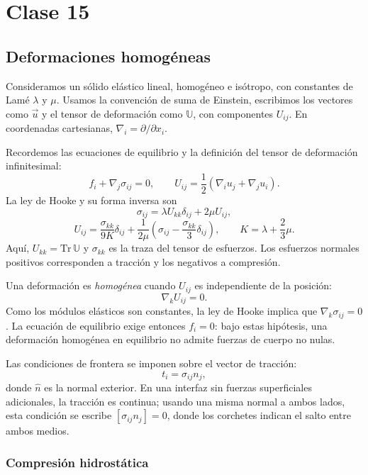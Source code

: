 \chapter{Clase 15}

\section{Deformaciones homogéneas}

Consideramos un sólido elástico lineal, homogéneo e isótropo, con constantes de Lamé $\lambda$ y $\mu$. Usamos la convención de suma de Einstein, escribimos los vectores como $\vec u$ y el tensor de deformación como $\mathbb U$, con componentes $U_{ij}$. En coordenadas cartesianas, $\nabla_i=\partial/\partial x_i$.

Recordemos las ecuaciones de equilibrio y la definición del tensor de deformación infinitesimal:
\[
f_i+\nabla_j\sigma_{ij}=0,
\qquad
U_{ij}=\frac{1}{2}(\nabla_i u_j+\nabla_j u_i).
\]
La ley de Hooke y su forma inversa son
\[
\sigma_{ij}=\lambda U_{kk}\delta_{ij}+2\mu U_{ij},
\]
\[
U_{ij}=\frac{\sigma_{kk}}{9K}\delta_{ij}
+\frac{1}{2\mu}\left(\sigma_{ij}-\frac{\sigma_{kk}}{3}\delta_{ij}\right),
\qquad K=\lambda+\frac{2}{3}\mu.
\]
Aquí, $U_{kk}=\mathrm{Tr}\,\mathbb U$ y $\sigma_{kk}$ es la traza del tensor de esfuerzos. Los esfuerzos normales positivos corresponden a tracción y los negativos a compresión.

Una deformación es \emph{homogénea} cuando $U_{ij}$ es independiente de la posición:
\[
\nabla_k U_{ij}=0.
\]
Como los módulos elásticos son constantes, la ley de Hooke implica que $\nabla_k\sigma_{ij}=0$. La ecuación de equilibrio exige entonces $f_i=0$: bajo estas hipótesis, una deformación homogénea en equilibrio no admite fuerzas de cuerpo no nulas.

Las condiciones de frontera se imponen sobre el vector de tracción:
\[
t_i=\sigma_{ij}n_j,
\]
donde $\hat n$ es la normal exterior. En una interfaz sin fuerzas superficiales adicionales, la tracción es continua; usando una misma normal a ambos lados, esta condición se escribe $[\sigma_{ij}n_j]=0$, donde los corchetes indican el salto entre ambos medios.

\subsection{Compresión hidrostática}

